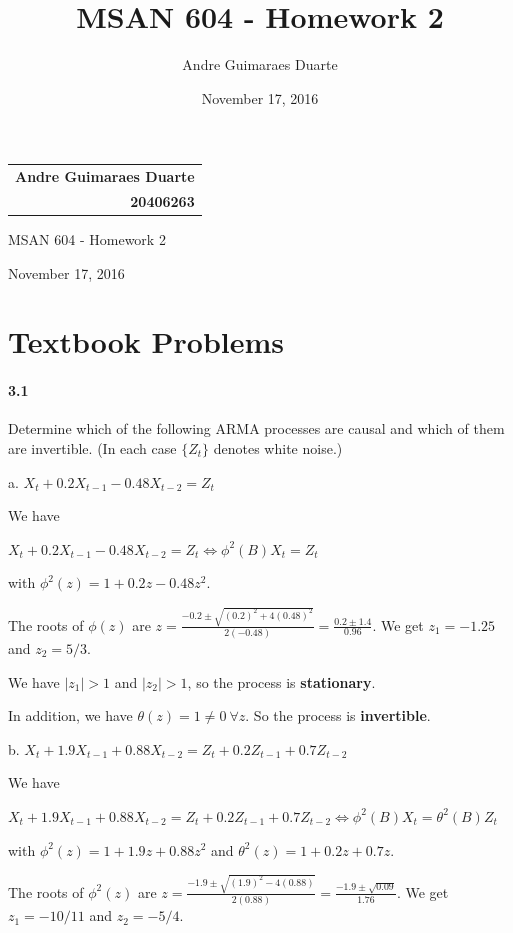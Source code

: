 \documentclass[]{article}
\title{MSAN 604 - Homework 2}
\author{Andre Guimaraes Duarte}
\date{November 17, 2016}
\let\oldparagraph\paragraph
\renewcommand{\paragraph}[1]{\oldparagraph{#1}\mbox{}}
\begin{document}
\null\hfill\begin{tabular}[t]{r@{}}
  \textbf{\LARGE Andre Guimaraes Duarte} \\
  \textbf{\Large 20406263}
\end{tabular}

\begin{center}
\Huge
MSAN 604 - Homework 2

\Large
November 17, 2016

\normalsize
\end{center}

\section{Textbook Problems}
\paragraph{3.1}
Determine which of the following ARMA processes are causal and which of
them are invertible. (In each case $\{Z_t\}$ denotes white noise.)

a. $X_t + 0.2 X_{t-1} - 0.48 X_{t-2} = Z_t$

\color{blue}
We have 

$X_t + 0.2 X_{t-1} - 0.48 X_{t-2} = Z_t \Leftrightarrow \phi^2(B)X_t = Z_t$

with $\phi^2(z) = 1 + 0.2 z - 0.48 z^2$.

The roots of $\phi(z)$ are $z = \frac{-0.2 \pm \sqrt{(0.2)^2 + 4(0.48)^2}}{2(-0.48)} = \frac{0.2 \pm 1.4}{0.96}$. We get $z_1 = -1.25$ and $z_2 = 5/3$.

We have $|z_1| > 1$ and $|z_2| > 1$, so the process is \textbf{stationary}.

In addition, we have $\theta (z) = 1 \neq 0\ \forall z$. So the process is \textbf{invertible}.
\color{black}

b. $X_t + 1.9 X_{t-1} + 0.88 X_{t-2} = Z_t + 0.2 Z_{t-1} + 0.7 Z_{t-2}$

\color{blue}
We have

$X_t + 1.9 X_{t-1} + 0.88 X_{t-2} = Z_t + 0.2 Z_{t-1} + 0.7 Z_{t-2} \Leftrightarrow \phi^2(B)X_t = \theta^2(B)Z_t$

with $\phi^2(z) = 1 + 1.9 z + 0.88 z^2$ and $\theta^2(z) = 1 + 0.2 z + 0.7 z$.

The roots of $\phi^2(z)$ are $z = \frac{-1.9 \pm \sqrt{(1.9)^2 - 4(0.88)}}{2(0.88)} = \frac{-1.9 \pm \sqrt{0.09}}{1.76}$. We get $z_1 = -10/11$ and $z_2 = -5/4$.
\end{document}
